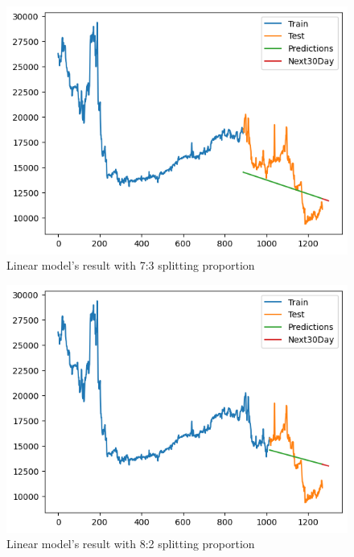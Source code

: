 \documentclass{ieeeojies}
\begin{document}
\begin{figure}[H]
  \centering
  \begin{minipage}{0.8\linewidth}
    \centering
    \includegraphics[width=\linewidth]{bibliography/Figure/LN_DHT73.png}
    \caption{Linear model's result with 7:3 splitting proportion}
    \label{fig8}
  \end{minipage}
\end{figure}

\begin{figure}[H]
  \centering
  \begin{minipage}{0.8\linewidth}
    \centering
    \includegraphics[width=\linewidth]{bibliography/Figure/LN_DHT82.png}
    \caption{Linear model's result with 8:2 splitting proportion}
    \label{fig8}
  \end{minipage}
\end{figure}
\end{document}
